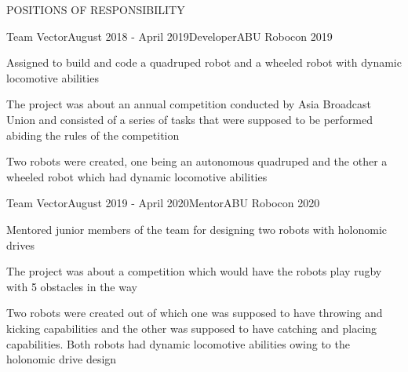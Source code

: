 \documentclass{resume} %
\begin{document}
\pagebreak

\begin{rSection}{POSITIONS OF RESPONSIBILITY}

\begin{rSubsection}{Team Vector}{August 2018 - April 2019}{Developer}{ABU Robocon 2019}
\item Assigned to build and code a quadruped robot and a wheeled robot with dynamic locomotive abilities
\item The project was about an annual competition conducted by Asia Broadcast Union and consisted of a series of tasks that were supposed to be performed abiding the rules of the competition
\item Two robots were created, one being an autonomous quadruped and the other a wheeled robot which had dynamic locomotive abilities
\end{rSubsection}


\begin{rSubsection}{Team Vector}{August 2019 - April 2020}{Mentor}{ABU Robocon 2020}
\item Mentored junior members of the team for designing two robots with holonomic drives
\item The project was about a competition which would have the robots play rugby with 5 obstacles in the way
\item Two robots were created out of which one was supposed to have throwing and kicking capabilities and the other was supposed to have catching and placing capabilities. Both robots had dynamic locomotive abilities owing to the holonomic drive design
\end{rSubsection}


\end{rSection}
\end{document}
